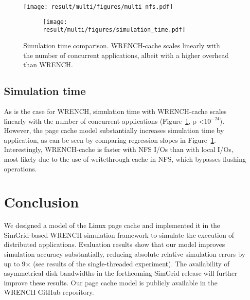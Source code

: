 \documentclass[conference]{IEEEtran}
\newcommand{\simgrid}{SimGrid\xspace}
\newcommand{\wrench}{WRENCH\xspace}
\begin{document}
            \begin{figure*}
                \begin{subfigure}{\linewidth}
                    \centering
                    \texttt{[image: result/multi/figures/multi\_nfs.pdf]}
                \end{subfigure}
                \caption{NFS results with 3~GB files (\textit{Exp 3})}
                \label{fig:multi_nfs}
                \end{figure*}
    
            \begin{figure}
                \begin{subfigure}{\columnwidth}
                    \centering
                    \texttt{[image: result/multi/figures/simulation\_time.pdf]}
                \end{subfigure}
                \caption{Simulation time comparison. \wrench-cache scales
                linearly with the number of concurrent applications, albeit
                with a higher overhead than \wrench.}
                \label{fig:multi_time}
                \end{figure}
    
        \subsection{Simulation time}
        As is the case for \wrench, simulation time with \wrench-cache scales
        linearly with the number of concurrent applications
        (Figure~\ref{fig:multi_time}, p \textless $10^{-24}$). However, the page
        cache model substantially increases simulation time by
        application, as can be seen by comparing regression slopes in
        Figure~\ref{fig:multi_time}. Interestingly, \wrench-cache is faster with 
        NFS I/Os than with local I/Os, most likely due to the use of writethrough
        cache in NFS, which bypasses flushing operations.

    \section{Conclusion}
    \label{discussion}
    We designed a model of the Linux page cache and implemented it in the
    \simgrid-based \wrench simulation framework to simulate the execution
    of distributed applications.
    Evaluation results show that our model improves simulation accuracy
    substantially, reducing absolute relative simulation errors by up to
    9$\times$ (see results of the single-threaded experiment). The
    availability of asymmetrical disk bandwidths in the forthcoming
    \simgrid release will further improve these results.
    Our page cache model is publicly available in the \wrench GitHub
    repository.
\end{document}
